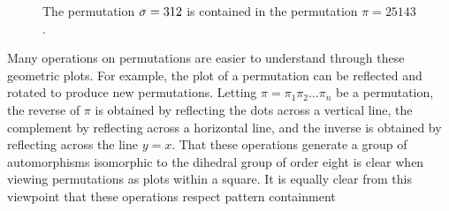     \begin{figure}[t]
      \centering
        \hspace{1pc}
        \raisebox{2pc}{$\subset$}
        \hspace{1pc}
        \hspace{1pc}
        \raisebox{2pc}{$= $}
        \hspace{1pc}

      \caption{The permutation $\sigma = 312$ is contained in the permutation $\pi =
                25143$. }
      \label{prelim:fig:plotpattern}
    \end{figure}

    
    Many operations on permutations are easier to understand
    through these geometric plots. For example, the plot of a permutation can
    be reflected and rotated to produce new permutations. Letting $\pi = \pi_1
    \pi_2 \dots \pi_n$ be a permutation, the reverse of $\pi$ is obtained by
    reflecting the dots across a vertical line, the complement by reflecting
    across a horizontal line, and the inverse is obtained by reflecting across
    the line $y = x$. That these operations generate a group of automorphisms
    isomorphic to the dihedral group of order eight is clear when
    viewing permutations as plots within a square. It is equally clear from
    this viewpoint that these operations respect pattern containment
    
